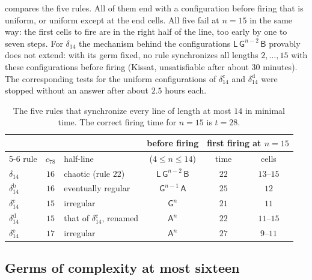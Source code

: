  compares the five rules. All of them end with a
configuration before firing that is uniform, or uniform except at the end
cells. All five fail at $n=15$ in the same way: the first cells to fire
are in the right half of the line, too early by one to seven steps. For
$\delta_{14}$ the mechanism behind the configurations
$\mathsf L\,\mathsf G^{n-2}\,\mathsf B$ provably does not extend: with its
germ fixed, no rule synchronizes all lengths $2,\dots,15$ with these
configurations before firing (Kissat, unsatisfiable after about $30$
minutes). The corresponding tests for the uniform configurations of
$\delta_{14}^{\mathrm c}$ and $\delta_{14}^{\mathrm d}$ were stopped without
an answer after about $2.5$ hours each.

\begin{table}[ht]
\centering\small
\begin{tabular}{@{}lclccc@{}}
\toprule
 & & & before firing & \multicolumn{2}{c}{first firing at $n=15$}\\
\cmidrule(l){5-6}
rule & $c_{78}$ & half-line & ($4\le n\le14$) & time & cells\\
\midrule
$\delta_{14}$ & $16$ & chaotic (rule $22$) & $\mathsf L\,\mathsf G^{n-2}\,\mathsf B$ & $22$ & $13$--$15$\\
$\delta_{14}^{\mathrm b}$ & $16$ & eventually regular & $\mathsf G^{n-1}\,\mathsf A$ & $25$ & $12$\\
$\delta_{14}^{\mathrm c}$ & $15$ & irregular & $\mathsf G^{n}$ & $21$ & $11$\\
$\delta_{14}^{\mathrm d}$ & $15$ & that of $\delta_{14}^{\mathrm c}$, renamed & $\mathsf A^{n}$ & $22$ & $11$--$15$\\
$\delta_{14}^{\mathrm e}$ & $17$ & irregular & $\mathsf A^{n}$ & $27$ & $9$--$11$\\
\bottomrule
\end{tabular}
\caption{The five rules that synchronize every line of length at most $14$
in minimal time. The correct firing time for $n=15$ is $t=28$.}
\label{tab:more14}
\end{table}

\subsection{Germs of complexity at most sixteen}\label{app:k16}

